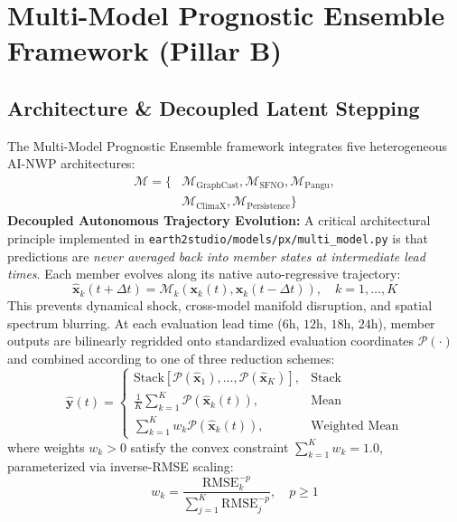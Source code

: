 \documentclass[10pt,twocolumn,letterpaper]{article}
\begin{document}
\section{Multi-Model Prognostic Ensemble Framework (Pillar B)}

\subsection{Architecture \& Decoupled Latent Stepping}
The Multi-Model Prognostic Ensemble framework integrates five heterogeneous AI-NWP architectures:
\begin{equation}
\begin{split}
\mathcal{M} = \{ &\mathcal{M}_\mathrm{GraphCast}, \mathcal{M}_\mathrm{SFNO}, \mathcal{M}_\mathrm{Pangu}, \\
&\mathcal{M}_\mathrm{ClimaX}, \mathcal{M}_\mathrm{Persistence} \}
\end{split}
\end{equation}
\textbf{Decoupled Autonomous Trajectory Evolution:} A critical architectural principle implemented in \texttt{earth2studio/models/px/multi\_model.py} is that predictions are \emph{never averaged back into member states at intermediate lead times}. Each member evolves along its native auto-regressive trajectory:
\begin{equation}
\hat{\mathbf{x}}_k(t + \Delta t) = \mathcal{M}_k\left( \mathbf{x}_k(t), \mathbf{x}_k(t - \Delta t) \right), \quad k = 1, \dots, K
\end{equation}
This prevents dynamical shock, cross-model manifold disruption, and spatial spectrum blurring. At each evaluation lead time ($6\si{\hour}$, $12\si{\hour}$, $18\si{\hour}$, $24\si{\hour}$), member outputs are bilinearly regridded onto standardized evaluation coordinates $\mathcal{P}(\cdot)$ and combined according to one of three reduction schemes:
\begin{equation}
\hat{\mathbf{y}}(t) = \begin{cases}
\mathrm{Stack}\left[ \mathcal{P}(\hat{\mathbf{x}}_1), \dots, \mathcal{P}(\hat{\mathbf{x}}_K) \right], & \text{Stack} \\
\frac{1}{K}\sum_{k=1}^K \mathcal{P}(\hat{\mathbf{x}}_k(t)), & \text{Mean} \\
\sum_{k=1}^K w_k \mathcal{P}(\hat{\mathbf{x}}_k(t)), & \text{Weighted Mean}
\end{cases}
\label{eq:mme_reduction}
\end{equation}
where weights $w_k > 0$ satisfy the convex constraint $\sum_{k=1}^K w_k = 1.0$, parameterized via inverse-RMSE scaling:
\begin{equation}
w_k = \frac{\mathrm{RMSE}_k^{-p}}{\sum_{j=1}^K \mathrm{RMSE}_j^{-p}}, \quad p \ge 1
\end{equation}
\end{document}
